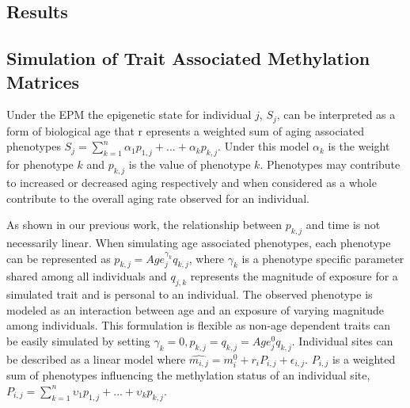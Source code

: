 \documentclass{article}
\begin{document}
{\begin{linenumbers}
\section{Results}

\subsection{Simulation of Trait Associated Methylation Matrices}

Under the EPM the epigenetic state for individual $j$, $S_j$, can be interpreted as a form of biological age that r
epresents a weighted sum of aging associated phenotypes 
$S_j = \sum^n_{k=1} \alpha_{1} p_{1,j} + ... + \alpha_{k} p_{k,j}$. Under this model $\alpha_{k}$ is the weight for 
phenotype $k$ and $p_{k,j}$ is the value of phenotype $k$.  Phenotypes may contribute to increased or decreased 
aging respectively and when considered as a whole contribute to the overall aging rate observed for an individual.

As shown in our previous work\cite{Snir2019-ii}, the relationship between $p_{k,j}$ and time is not necessarily 
linear. When simulating age associated phenotypes, each phenotype can be represented as 
$p_{k,j} = Age_j^{\gamma_{k}} q_{k,j}$, where $\gamma_{k}$ is a phenotype specific parameter shared among all 
individuals and $q_{j,k}$ represents the magnitude of exposure for a simulated trait and is personal to an 
individual. The observed phenotype is modeled as an interaction between age and an exposure of varying magnitude 
among individuals. This formulation is flexible as non-age dependent traits can be easily simulated by setting 
$\gamma_{k}=0, p_{k,j} = q_{k,j} = Age_j^{0}q_{k,j}$.  Individual sites can be described as a linear model where 
$\hat{m_{i,j}} = m^0_i + r_i P_{i,j} + \epsilon_{i,j}$. $P_{i,j}$ is a weighted sum of phenotypes influencing the 
methylation status of an individual site, $P_{i,j} = \sum^n_{k=1} \upsilon_{1} p_{1,j} + ... + \upsilon_{k} p_{k,j}$. 


\end{linenumbers}}
\end{document}
